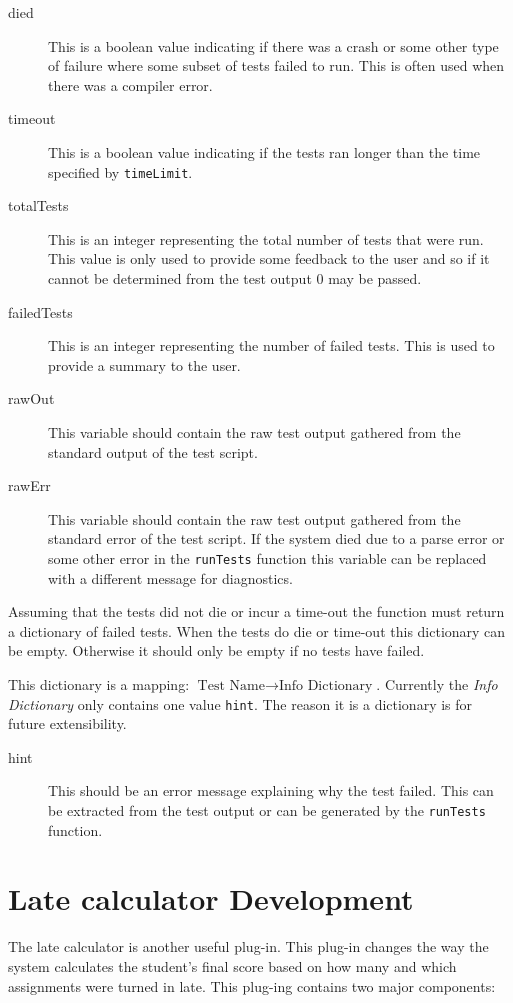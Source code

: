 \documentclass[11pt]{report}
\begin{document}
\begin{description}
\item[died] This is a boolean value indicating if there was a crash or some other type of failure where 
some subset of tests failed to run. This is often used when there was a compiler error.
\item[timeout] This is a boolean value indicating if the tests ran longer than the time specified by 
\texttt{timeLimit}. 
\item[totalTests] This is an integer representing the total number of tests that were run. This value is
only used to provide some feedback to the user and so if it cannot be determined from the test output 
\(0\) may be passed.
\item[failedTests] This is an integer representing the number of failed tests. This is used to provide a
summary to the user.
\item[rawOut] This variable should contain the raw test output gathered from the standard output of the
test script.
\item[rawErr] This variable should contain the raw test output gathered from the standard error of the
test script. If the system died due to a parse error or some other error in the \texttt{runTests} function
this variable can be replaced with a different message for diagnostics.
\end{description}

Assuming that the tests did not die or incur a time-out the function must return a dictionary of failed 
tests. When the tests do die or time-out this dictionary can be empty. Otherwise it should only be empty
if no tests have failed.

This dictionary is a mapping: \(\text{Test Name} \rightarrow \text{Info Dictionary}\).
Currently the \emph{Info Dictionary} only contains one value \texttt{hint}. The reason it is a dictionary
is for future extensibility. 

\begin{description}
\item[hint] This should be an error message explaining why the test failed. This can be extracted from
the test output or can be generated by the \texttt{runTests} function.
\end{description}

\section{Late calculator Development}
The late calculator is another useful plug-in. This plug-in changes the way the system calculates the 
student's final score based on how many and which assignments were turned in late. This plug-ing
contains two major components:
\end{document}
